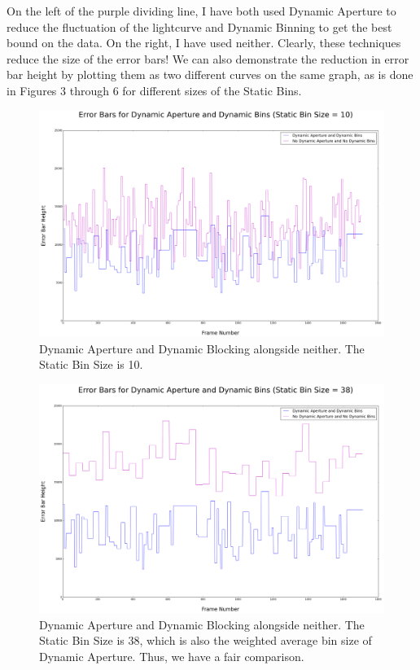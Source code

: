 \documentclass[12pt]{article}
\begin{document}
On the left of the purple dividing line, I have both used Dynamic Aperture to reduce the fluctuation of the lightcurve and Dynamic Binning to get the best bound on the data. On the right, I have used neither. Clearly, these techniques reduce the size of the error bars! We can also demonstrate the reduction in error bar height by plotting them as two different curves on the same graph, as is done in Figures 3 through 6 for different sizes of the Static Bins.
\begin{figure}[p]
\begin{center}
\includegraphics[scale = 0.3]{10.png}
\caption{Dynamic Aperture and Dynamic Blocking alongside neither. The Static Bin Size is 10.}
\end{center}
\end{figure}
\begin{figure}[p]
\begin{center}
\includegraphics[scale = 0.3]{38.png}
\caption{Dynamic Aperture and Dynamic Blocking alongside neither. The Static Bin Size is 38, which is also the weighted average bin size of Dynamic Aperture. Thus, we have a fair comparison.}
\end{center}
\end{figure}
\end{document}
